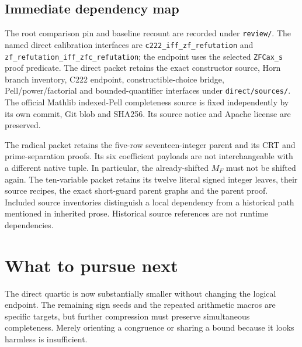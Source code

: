 \documentclass[11pt]{article}
\begin{document}
\subsection{Immediate dependency map}
The root comparison pin and baseline recount are recorded under
\texttt{review/}. The named direct calibration interfaces are
\texttt{c222\_iff\_zf\_refutation} and
\texttt{zf\_refutation\_iff\_zfc\_refutation}; the endpoint uses the
selected \texttt{ZFCax\_s} proof predicate. The direct packet retains the exact constructor source,
Horn branch inventory, C222 endpoint, constructible-choice bridge,
Pell/power/factorial and bounded-quantifier interfaces under
\texttt{direct/sources/}. The official Mathlib indexed-Pell completeness
source is fixed independently by its own commit, Git blob and SHA256.
Its source notice and Apache license are preserved.

The radical packet retains the five-row seventeen-integer parent and its
CRT and prime-separation proofs. Its six coefficient payloads are not
interchangeable with a different native tuple. In particular, the
already-shifted $M_F$ must not be shifted again. The ten-variable packet
retains its twelve literal signed integer leaves, their source recipes,
the exact short-guard parent graphs and the parent proof. Included source
inventories distinguish a local dependency from a historical path
mentioned in inherited prose. Historical source references are not
runtime dependencies.

\section{What to pursue next}
\label{sec:next}
The direct quartic is now substantially smaller without changing the
logical endpoint. The remaining sign seeds and the repeated arithmetic
macros are specific targets, but further compression must preserve
simultaneous completeness. Merely orienting a congruence or sharing a
bound because it looks harmless is insufficient.
\end{document}
